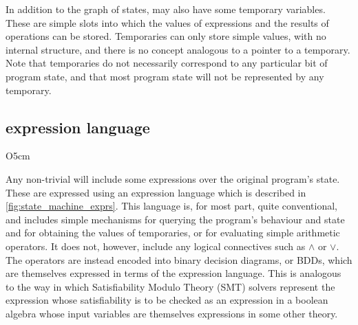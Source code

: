 In addition to the graph of states, {\StateMachines} may also have
some temporary variables.  These are simple slots into which the
values of expressions and the results of  operations can
be stored.  Temporaries can only store simple values, with no internal
structure, and there is no concept analogous to a pointer to a
temporary.  Note that {\StateMachine} temporaries do not necessarily
correspond to any particular bit of program state, and that most
program state will not be represented by any temporary.

\subsection{{\STateMachine} expression language}
\label{sect:sm_expr_language}

\begin{wrapfigure}{O}{5cm}
  \vspace{-12pt}
  \vspace{-12pt}
\end{wrapfigure}
Any non-trivial {\StateMachine} will include some expressions over the
original program's state.  These are expressed using an expression
language which is described in \autoref{fig:state_machine_exprs}.
This language is, for most part, quite conventional, and includes
simple mechanisms for querying the program's behaviour and state and
for obtaining the values of {\StateMachine} temporaries, or for
evaluating simple arithmetic operators.  It does not, however, include
any logical connectives such as $\wedge$ or $\vee$.  The operators are
instead encoded into binary decision diagrams, or
BDDs\cite{Brace1990}, which are themselves expressed in terms of the
expression language.  This is analogous to the way in which
Satisfiability Modulo Theory (SMT) solvers represent the expression
whose satisfiability is to be checked as an expression in a boolean
algebra whose input variables are themselves expressions in some other
theory.

